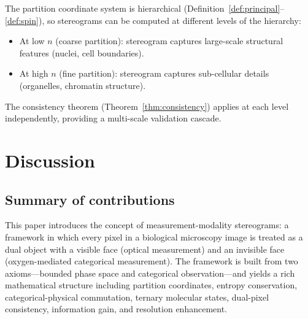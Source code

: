\documentclass[11pt,twocolumn,a4paper]{article}
\begin{document}
The partition coordinate system is hierarchical (Definition~\ref{def:principal}--\ref{def:spin}), so stereograms can be computed at different levels of the hierarchy:
\begin{itemize}
\item At low $n$ (coarse partition): stereogram captures large-scale structural features (nuclei, cell boundaries).
\item At high $n$ (fine partition): stereogram captures sub-cellular details (organelles, chromatin structure).
\end{itemize}
The consistency theorem (Theorem~\ref{thm:consistency}) applies at each level independently, providing a multi-scale validation cascade.


\section{Discussion}\label{sec:discussion}

\subsection{Summary of contributions}

This paper introduces the concept of measurement-modality stereograms: a framework in which every pixel in a biological microscopy image is treated as a dual object with a visible face (optical measurement) and an invisible face (oxygen-mediated categorical measurement).
The framework is built from two axioms---bounded phase space and categorical observation---and yields a rich mathematical structure including partition coordinates, entropy conservation, categorical-physical commutation, ternary molecular states, dual-pixel consistency, information gain, and resolution enhancement.
\end{document}
